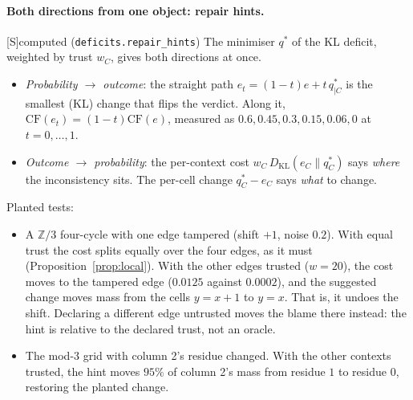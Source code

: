 \documentclass[11pt]{article}
\theoremstyle{definition}
\theoremstyle{remark}
\newcommand{\Z}{\mathbb{Z}}
\newcommand{\CF}{\mathrm{CF}}
\newcommand{\KL}{D_{\mathrm{KL}}}
\newcommand{\src}[1]{\textsf{\small[#1]}}
\newcommand{\st}[1]{\textsf{\small\color{gray}#1}}
\begin{document}
\paragraph{Both directions from one object: repair hints.}\src{S}\st{computed} (\texttt{deficits.repair\_hints})
The minimiser $q^*$ of the KL deficit, weighted by trust $w_C$, gives both directions at once.
\begin{itemize}
  \item \emph{Probability $\to$ outcome}: the straight path $e_t=(1-t)e+t\,q^*_{|C}$ is the smallest (KL) change that flips the verdict. Along it, $\CF(e_t)=(1-t)\CF(e)$, measured as $0.6,0.45,0.3,0.15,0.06,0$ at $t=0,\dots,1$.
  \item \emph{Outcome $\to$ probability}: the per-context cost $w_C\,\KL(e_C\|q^*_C)$ says \emph{where} the inconsistency sits. The per-cell change $q^*_C-e_C$ says \emph{what} to change.
\end{itemize}
Planted tests:
\begin{itemize}
  \item A $\Z/3$ four-cycle with one edge tampered (shift $+1$, noise $0.2$). With equal trust the cost splits equally over the four edges, as it must (Proposition~\ref{prop:local}). With the other edges trusted ($w=20$), the cost moves to the tampered edge ($0.0125$ against $0.0002$), and the suggested change moves mass from the cells $y=x+1$ to $y=x$. That is, it undoes the shift. Declaring a different edge untrusted moves the blame there instead: the hint is relative to the declared trust, not an oracle.
  \item The mod-3 grid with column 2's residue changed. With the other contexts trusted, the hint moves $95\%$ of column 2's mass from residue $1$ to residue $0$, restoring the planted change.
\end{itemize}
\end{document}
